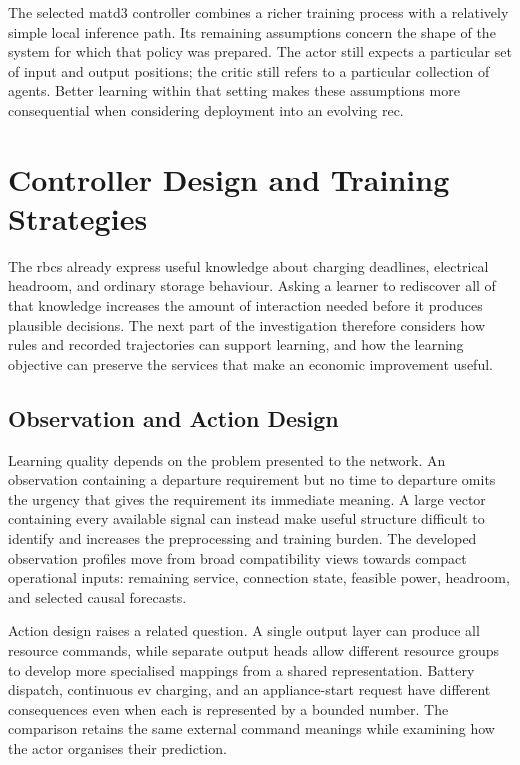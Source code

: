 \begin{samepage}
The selected \gls{matd3} controller combines a richer training process with a relatively simple local inference path. Its remaining assumptions concern the shape of the system for which that policy was prepared. The actor still expects a particular set of input and output positions; the critic still refers to a particular collection of agents. Better learning within that setting makes these assumptions more consequential when considering deployment into an evolving \gls{rec}.\par
\end{samepage}


\section{Controller Design and Training Strategies}
\label{sec:data-efficient-hierarchy}
\label{sec:learning-efficiency}
\label{sec:control-learning-interface}

The \glspl{rbc} already express useful knowledge about charging deadlines, electrical headroom, and ordinary storage behaviour. Asking a learner to rediscover all of that knowledge increases the amount of interaction needed before it produces plausible decisions. The next part of the investigation therefore considers how rules and recorded trajectories can support learning, and how the learning objective can preserve the services that make an economic improvement useful.

\subsection{Observation and Action Design}

Learning quality depends on the problem presented to the network. An observation containing a departure requirement but no time to departure omits the urgency that gives the requirement its immediate meaning. A large vector containing every available signal can instead make useful structure difficult to identify and increases the preprocessing and training burden. The developed observation profiles move from broad compatibility views towards compact operational inputs: remaining service, connection state, feasible power, headroom, and selected causal forecasts.

Action design raises a related question. A single output layer can produce all resource commands, while separate output heads allow different resource groups to develop more specialised mappings from a shared representation. Battery dispatch, continuous \gls{ev} charging, and an appliance-start request have different consequences even when each is represented by a bounded number. The comparison retains the same external command meanings while examining how the actor organises their prediction.

